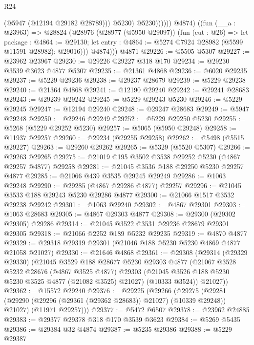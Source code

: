\begin{lexlean}{R24}
\begin{coremodule}
                        (@5947 (@12194 @29182 @28789)))
                      @5230)
                    @5230))))))
          @4874)
        ((fun (__a : @23963) =>
        @28824
          (@28976
            (@28977 (@5950 @29097))
            (fun (cut : @26) =>
            let package : @4864 := @29130;
            let entry : @4864 := @5274 @7924 @28982 (@5599 @11591 @28982); @29016)))
          @4874)))
    @4871
@29226 := @5505 @5307
@29227 := @23962 @23967
@29230 := @29226 @29227 @318 @170
@29234 := @29230 @3539 @3623 @4877 @5307
@29235 := @21361 @4868
@29236 := @6020 @29235
@29237 := @5229 @29236
@29238 := @29237 @28679
@29239 := @5229 @29238
@29240 := @21364 @4868
@29241 := @12190 @29240
@29242 := @29241 @28683
@29243 := @29239 @29242
@29245 := @5229 @29243 @5230
@29246 := @5229 @29245
@29247 := @12194 @29240
@29248 := @29247 @28683
@29249 := @5947 @29248
@29250 := @29246 @29249
@29252 := @5229 @29250 @5230
@29255 := @5268 (@5229 @29252 @5230)
@29257 := @5065 (@5950 @29248)
@29258 := @11937 @29257
@29260 := @29234 (@29255 @29258)
@29262 := @5498 (@5515 @29227)
@29263 := @29260 @29262
@29265 := @5329 (@5520 @5307)
@29266 := @29263 @29265
@29275 := @21019 @195 @3502 @3538 @29252 @5230 (@4867 @29257 @4877) @29258
@29281 := @21045 @3536 @188 @29250 @5230 @29257 @4877
@29285 := @21066 @439 @3535 @29245 @29249
@29286 := @1063 @29248
@29290 := @29285 (@4867 @29286 @4877) @29257
@29296 := @21045 @3533 @188 @29243 @5230 @29286 @4877
@29300 := @21066 @1517 @3532 @29238 @29242
@29301 := @1063 @29240
@29302 := @4867 @29301
@29303 := @1063 @28683
@29305 := @4867 @29303 @4877
@29308 := @29300 (@29302 @29305) @29286
@29314 := @21045 @3522 @3531 @29236 @28679 @29301 @29305
@29318 := @21066 @2252 @189 @5232 @29235
@29319 := @4870 @4877
@29329 := @29318 @29319 @29301 (@21046 @188 @5230 @5230 @4869 @4877 @21058 @21027)
@29330 := @21646 @4868
@29361 := @29308
    (@29314
      (@29329 @29330)
      (@21045
        @3529
        @188
        @28677
        @5230
        @29303
        @4877
        (@21067
          @3528
          @5232
          @28676
          (@4867 @3525 @4877)
          @29303
          (@21045 @3526 @188 @5230 @5230 @3525 @4877 (@21082 @3525) @21027)
          (@10333 @3524))
        @21027))
@29362 := @15572 @29240
@29376 := @29225
    (@29266
      (@29275
        (@29281 (@29290 (@29296 (@29361 (@29362 @28683)) @21027) (@10339 @29248)) @21027)
        (@11971 @29257)))
@29377 := @5472 @6507
@29378 := @23962 @24885
@29383 := @29377 @29378 @318 @170 @3539 @3623
@29384 := @5269 @5435
@29386 := @29384 @32 @4874
@29387 := @5235 @29386
@29388 := @5229 @29387

\end{coremodule}
\end{lexlean}
